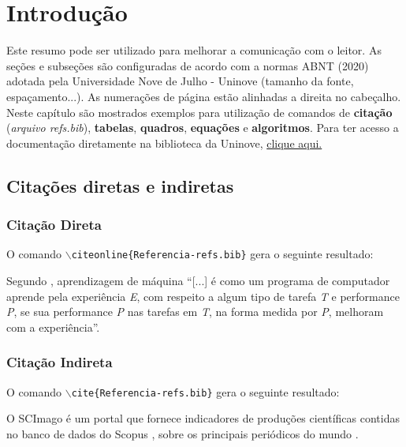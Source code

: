 \chapter{Introdução}
\label{ch:introducao}
\begin{resumocapitulo}
	Este resumo pode ser utilizado para melhorar a comunicação com o leitor. As seções e subseções são configuradas de acordo com a normas ABNT (2020) adotada pela Universidade Nove de Julho - Uninove (tamanho da fonte, espaçamento...). As numerações de página estão alinhadas a direita no cabeçalho. Neste capítulo são mostrados exemplos para utilização de comandos de \textbf{citação} (\textit{arquivo refs.bib}), \textbf{tabelas}, \textbf{quadros}, \textbf{equações} e \textbf{algoritmos}. Para ter acesso a documentação diretamente na biblioteca da Uninove, \href{http://docs.uninove.br/arte/pdfs/Manual_de_Trabalhos_Academicos_ABNT_UNINOVE.pdf}{clique aqui.}
\end{resumocapitulo}

\section{Citações diretas e indiretas}
\label{sec:citacoes}
\subsection{Citação Direta}
\label{subsec:citacao_direta}
O comando \texttt{$\backslash$citeonline\{Referencia-refs.bib\}} gera o seguinte resultado:

Segundo , aprendizagem de máquina ``[...] é como um programa de computador aprende pela experiência \textit{E}, com respeito a algum tipo de tarefa \textit{T} e performance \textit{P}, se sua performance \textit{P} nas tarefas em \textit{T}, na forma medida por \textit{P}, melhoram com a experiência''.

\subsection{Citação Indireta}
\label{subsec:citacao_indireta}
O comando \texttt{$\backslash$cite\{Referencia-refs.bib\}} gera o seguinte resultado:

O SCImago é um portal que fornece indicadores de produções científicas contidas no banco de dados do Scopus \cite{Villasenor-Almaraz2019}, sobre os principais periódicos do mundo \cite{DUggento2016}.

